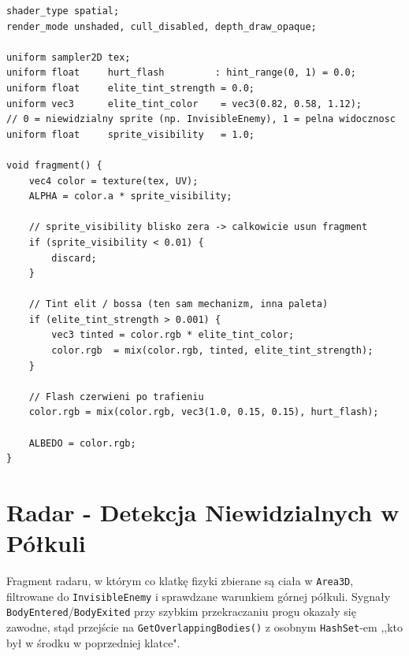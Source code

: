 \begin{lstlisting}[caption={Shaders/character\_hurt.gdshader - fragment() z tintem i niewidocznoscia},label={lst:shader},language={}]
shader_type spatial;
render_mode unshaded, cull_disabled, depth_draw_opaque;

uniform sampler2D tex;
uniform float     hurt_flash         : hint_range(0, 1) = 0.0;
uniform float     elite_tint_strength = 0.0;
uniform vec3      elite_tint_color    = vec3(0.82, 0.58, 1.12);
// 0 = niewidzialny sprite (np. InvisibleEnemy), 1 = pelna widocznosc
uniform float     sprite_visibility   = 1.0;

void fragment() {
    vec4 color = texture(tex, UV);
    ALPHA = color.a * sprite_visibility;

    // sprite_visibility blisko zera -> calkowicie usun fragment
    if (sprite_visibility < 0.01) {
        discard;
    }

    // Tint elit / bossa (ten sam mechanizm, inna paleta)
    if (elite_tint_strength > 0.001) {
        vec3 tinted = color.rgb * elite_tint_color;
        color.rgb  = mix(color.rgb, tinted, elite_tint_strength);
    }

    // Flash czerwieni po trafieniu
    color.rgb = mix(color.rgb, vec3(1.0, 0.15, 0.15), hurt_flash);

    ALBEDO = color.rgb;
}
\end{lstlisting}

\section{Radar - Detekcja Niewidzialnych w Półkuli}

Fragment radaru, w którym co klatkę fizyki zbierane są ciała w \texttt{Area3D}, filtrowane do \texttt{InvisibleEnemy} i sprawdzane warunkiem górnej półkuli. Sygnały \texttt{BodyEntered}/\texttt{BodyExited} przy szybkim przekraczaniu progu okazały się zawodne, stąd przejście na \texttt{Get\allowbreak Overlapping\allowbreak Bodies()} z osobnym \texttt{HashSet}-em ,,kto był w środku w poprzedniej klatce".

